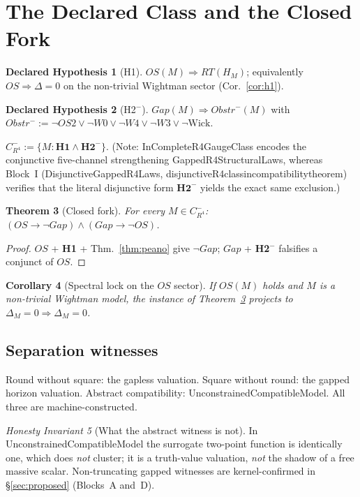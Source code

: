 \documentclass[11pt,a4paper]{article}
\def\R{R}\def\N{N}\def\Q{Q}\def\Z{Z}\def\Class{C}\def\OS{OS}\def\Gap{Gap}%
\def\RT{RT}\def\Obstr{Obstr}\def\Spec{Spec}\def\Htot{H}\def\Chit{chi-t}\def\Lean#1{#1}}
\theoremstyle{plain}
\newtheorem{theorem}{Theorem}[section]
\newtheorem{corollary}[theorem]{Corollary}
\theoremstyle{definition}
\newtheorem{hypothesis}[theorem]{Declared Hypothesis}
\theoremstyle{remark}
\newtheorem{invariant}[theorem]{Honesty Invariant}
\newcommand{\R}{\mathbb{R}}\newcommand{\N}{\mathbb{N}}\newcommand{\Q}{\mathbb{Q}}
\newcommand{\Z}{\mathbb{Z}}\newcommand{\Spec}{\operatorname{Spec}}
\newcommand{\OS}{\mathrm{OS}}\newcommand{\Gap}{\mathrm{Gap}}
\newcommand{\Obstr}{\mathrm{Obstr}}\newcommand{\RT}{\mathrm{RT}}
\newcommand{\Class}{\mathcal{C}}\newcommand{\Htot}{\mathcal{H}}
\newcommand{\Chit}{\chi_t}
\renewcommand{\_}{\oldunderscore\allowbreak}
\newcommand{\Lean}[1]{\texttt{\small #1}}
\begin{document}
\section{The Declared Class and the Closed Fork}
\begin{hypothesis}[H1]\label{hyp:H1}
$\OS(M)\Rightarrow\RT(H_M)$; equivalently $\OS\Rightarrow\Delta=0$ on the non-trivial Wightman
sector (Cor.~\ref{cor:h1}).
\end{hypothesis}
\begin{hypothesis}[H2$^-$]\label{hyp:H2}
$\Gap(M)\Rightarrow\Obstr^-(M)$ with
$\Obstr^-:=\neg\OS2\vee\neg W0\vee\neg W4\vee\neg W3\vee\neg\mathrm{Wick}$.
\end{hypothesis}
$\Class^-_{\R^4}:=\{M:\textbf{H1}\wedge\textbf{H2}^-\}$. (Note: \Lean{InCompleteR4GaugeClass} encodes the conjunctive five-channel strengthening \Lean{GappedR4StructuralLaws}, whereas Block~I (\Lean{DisjunctiveGappedR4Laws}, \Lean{disjunctive\_R4\_class\_incompatibility\_theorem}) verifies that the literal disjunctive form $\textbf{H2}^-$ yields the exact same exclusion.)
\begin{theorem}[Closed fork]\label{thm:fork}
For every $M\in\Class^-_{\R^4}$: $(\OS\to\neg\Gap)\wedge(\Gap\to\neg\OS)$.
\end{theorem}
\begin{proof}
$\OS$ + \textbf{H1} + Thm.~\ref{thm:peano} give $\neg\Gap$; $\Gap$ + \textbf{H2$^-$} falsifies a
conjunct of $\OS$.
\end{proof}
\begin{corollary}[Spectral lock on the $\OS$ sector]\label{cor:lock}
If $\OS(M)$ holds and $M$ is a non-trivial Wightman model, the instance of
Theorem~\ref{thm:fork} projects to $\Delta_M=0\Rightarrow\Delta_M=0$.
\end{corollary}
\subsection{Separation witnesses}
Round without square: the gapless valuation. Square without round: the gapped horizon valuation.
Abstract compatibility: \Lean{UnconstrainedCompatibleModel}. All three are machine-constructed.
\begin{invariant}[What the abstract witness is not]
In \Lean{UnconstrainedCompatibleModel} the surrogate two-point function is identically one,
which does \emph{not} cluster; it is a truth-value valuation, \emph{not} the shadow of a free
massive scalar. Non-truncating gapped witnesses are kernel-confirmed in \S\ref{sec:proposed} (Blocks~A and~D).
\end{invariant}
\end{document}
